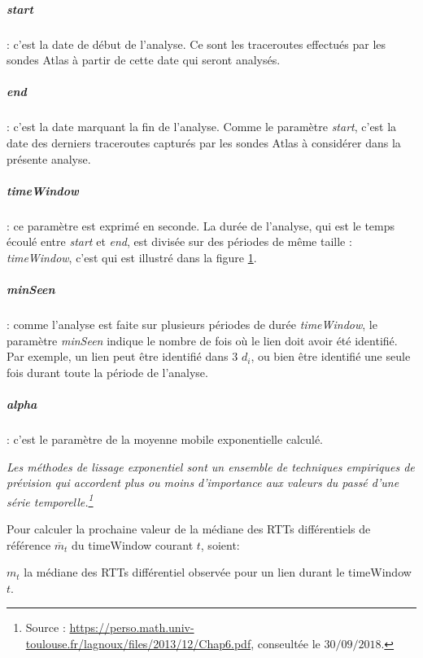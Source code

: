 \subparagraph{start} : c'est la date de début de l'analyse. Ce sont les traceroutes effectués par les sondes Atlas à partir de cette date qui seront analysés.

\subparagraph{end} : c'est la date marquant la fin de l'analyse. Comme le paramètre \textit{start}, c'est la date des derniers traceroutes capturés par les sondes Atlas à considérer dans la présente analyse.

\subparagraph{timeWindow} :  ce paramètre est exprimé en seconde. La durée de l'analyse, qui est le temps écoulé entre \textit{start} et \textit{end}, est divisée sur des périodes de même taille : \textit{timeWindow}, c'est qui est illustré dans la figure  \ref{fig:timing_tex}.




\begin{figure}[h]
	\centering
	\captionsetup{justification=centering}
	
	\caption{}
	\label{fig:timing_tex}
\end{figure}
%		 

\subparagraph{minSeen} : comme l'analyse est faite sur plusieurs périodes de durée \textit{timeWindow}, le paramètre \textit{minSeen} indique le nombre de fois où le lien doit avoir été identifié. Par exemple, un lien peut être identifié dans $3$ $d_i$, ou bien être identifié  une seule fois durant toute la période de l'analyse.

\subparagraph{alpha}: c'est le paramètre de la  moyenne mobile exponentielle calculé.

\guillemotleft \textit{ Les méthodes de lissage exponentiel  sont un ensemble de techniques empiriques de prévision qui accordent plus ou moins d'importance aux valeurs du passé d'une série temporelle.\footnote{Source : \url{https://perso.math.univ-toulouse.fr/lagnoux/files/2013/12/Chap6.pdf}, conseultée le $30/09/2018.$}} \guillemotright

Pour calculer la prochaine  valeur de la médiane des RTTs différentiels de référence $ \overline{m}_{t}$ du timeWindow  courant $ t $, soient: 

$m_t$ la médiane des RTTs différentiel observée pour un lien durant le timeWindow $t$. 

